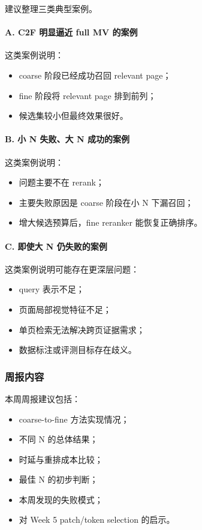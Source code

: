 \documentclass[UTF8,a4paper,12pt]{ctexart}
\begin{document}
	建议整理三类典型案例。
	
	\paragraph{A. C2F 明显逼近 full MV 的案例}
	
	这类案例说明：
	
	\begin{itemize}[leftmargin=2em]
		\item coarse 阶段已经成功召回 relevant page；
		\item fine 阶段将 relevant page 排到前列；
		\item 候选集较小但最终效果很好。
	\end{itemize}
	
	\paragraph{B. 小 N 失败、大 N 成功的案例}
	
	这类案例说明：
	
	\begin{itemize}[leftmargin=2em]
		\item 问题主要不在 rerank；
		\item 主要失败原因是 coarse 阶段在小 N 下漏召回；
		\item 增大候选预算后，fine reranker 能恢复正确排序。
	\end{itemize}
	
	\paragraph{C. 即使大 N 仍失败的案例}
	
	这类案例说明可能存在更深层问题：
	
	\begin{itemize}[leftmargin=2em]
		\item query 表示不足；
		\item 页面局部视觉特征不足；
		\item 单页检索无法解决跨页证据需求；
		\item 数据标注或评测目标存在歧义。
	\end{itemize}
	
	\subsubsection*{周报内容}
	
	本周周报建议包括：
	
	\begin{itemize}[leftmargin=2em]
		\item coarse-to-fine 方法实现情况；
		\item 不同 N 的总体结果；
		\item 时延与重排成本比较；
		\item 最佳 N 的初步判断；
		\item 本周发现的失败模式；
		\item 对 Week 5 patch/token selection 的启示。
	\end{itemize}
	
\end{document}
